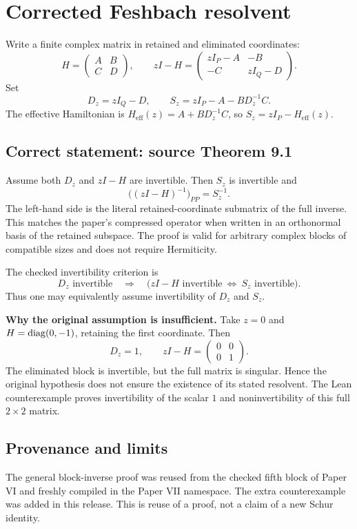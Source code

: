 \section{Corrected Feshbach resolvent}\label{supp1:section:003}
Write a finite complex matrix in retained and eliminated coordinates:
\[
H=\begin{pmatrix}A&B\\C&D\end{pmatrix},\qquad
zI-H=\begin{pmatrix}zI_P-A&-B\\-C&zI_Q-D\end{pmatrix}.
\]
Set
\[
D_z=zI_Q-D,\qquad S_z=zI_P-A-BD_z^{-1}C.
\]
The effective Hamiltonian is $H_{\mathrm{eff}}(z)=A+BD_z^{-1}C$, so
$S_z=zI_P-H_{\mathrm{eff}}(z)$.

\subsection{Correct statement: source Theorem 9.1}
Assume both $D_z$ and $zI-H$ are invertible. Then $S_z$ is invertible and
\[
\boxed{\bigl((zI-H)^{-1}\bigr)_{PP}=S_z^{-1}.}
\]
The left-hand side is the literal retained-coordinate submatrix of the full inverse. This matches the paper's compressed operator when written in an orthonormal basis of the retained subspace. The proof is valid for arbitrary complex blocks of compatible sizes and does not require Hermiticity.

The checked invertibility criterion is
\[
D_z\text{ invertible}\quad\Longrightarrow\quad
\bigl(zI-H\text{ invertible}\ \Longleftrightarrow\ S_z\text{ invertible}\bigr).
\]
Thus one may equivalently assume invertibility of $D_z$ and $S_z$.

\textbf{Why the original assumption is insufficient.}
Take $z=0$ and $H=\operatorname{diag}(0,-1)$, retaining the first coordinate. Then
\[
D_z=1,\qquad zI-H=\begin{pmatrix}0&0\\0&1\end{pmatrix}.
\]
The eliminated block is invertible, but the full matrix is singular. Hence the original hypothesis does not ensure the existence of its stated resolvent. The Lean counterexample proves invertibility of the scalar $1$ and noninvertibility of this full $2\times2$ matrix.



\subsection{Provenance and limits}
The general block-inverse proof was reused from the checked fifth block of Paper VI and freshly compiled in the Paper VII namespace. The extra counterexample was added in this release. This is reuse of a proof, not a claim of a new Schur identity.

